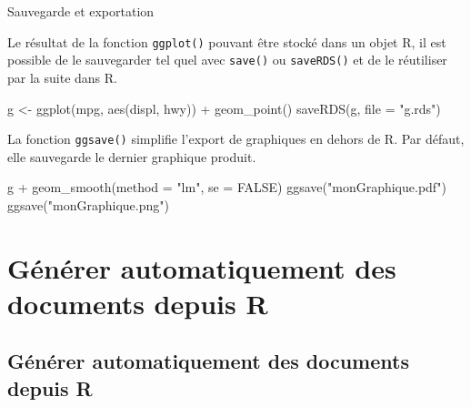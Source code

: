 \documentclass[12pt,ignorenonframetext,handout,]{beamer}
\newenvironment{Shaded}{}{}
\newcommand{\DataTypeTok}[1]{#1}
\newcommand{\KeywordTok}[1]{\textcolor[rgb]{0.00,0.00,1.00}{#1}}
\newcommand{\NormalTok}[1]{#1}
\newcommand{\OperatorTok}[1]{#1}
\newcommand{\OtherTok}[1]{\textcolor[rgb]{1.00,0.25,0.00}{#1}}
\newcommand{\StringTok}[1]{\textcolor[rgb]{0.00,0.50,0.50}{#1}}
\renewenvironment{Shaded}{\begin{snugshade}}{\end{snugshade}}
\begin{document}
\begin{frame}[fragile]{Sauvegarde et exportation}
\protect\hypertarget{sauvegarde-et-exportation}{}

Le résultat de la fonction \texttt{ggplot()} pouvant être stocké dans un
objet R, il est possible de le sauvegarder tel quel avec \texttt{save()}
ou \texttt{saveRDS()} et de le réutiliser par la suite dans R.

\begin{Shaded}
\begin{Highlighting}[]
\NormalTok{g <-}\StringTok{ }\KeywordTok{ggplot}\NormalTok{(mpg, }\KeywordTok{aes}\NormalTok{(displ, hwy)) }\OperatorTok{+}\StringTok{ }\KeywordTok{geom_point}\NormalTok{()}
\KeywordTok{saveRDS}\NormalTok{(g, }\DataTypeTok{file =} \StringTok{"g.rds"}\NormalTok{)}
\end{Highlighting}
\end{Shaded}

\pause La fonction \texttt{ggsave()} simplifie l’export de graphiques en
dehors de R. Par défaut, elle sauvegarde le dernier graphique produit.

\begin{Shaded}
\begin{Highlighting}[]
\NormalTok{g }\OperatorTok{+}\StringTok{ }\KeywordTok{geom_smooth}\NormalTok{(}\DataTypeTok{method =} \StringTok{"lm"}\NormalTok{, }\DataTypeTok{se =} \OtherTok{FALSE}\NormalTok{)}
\KeywordTok{ggsave}\NormalTok{(}\StringTok{"monGraphique.pdf"}\NormalTok{)}
\KeywordTok{ggsave}\NormalTok{(}\StringTok{"monGraphique.png"}\NormalTok{)}
\end{Highlighting}
\end{Shaded}

\end{frame}

\hypertarget{generer-automatiquement-des-documents-depuis-r}{%
\section{Générer automatiquement des documents depuis
R}\label{generer-automatiquement-des-documents-depuis-r}}

\subsection*{Générer automatiquement des documents depuis R}
\end{document}

